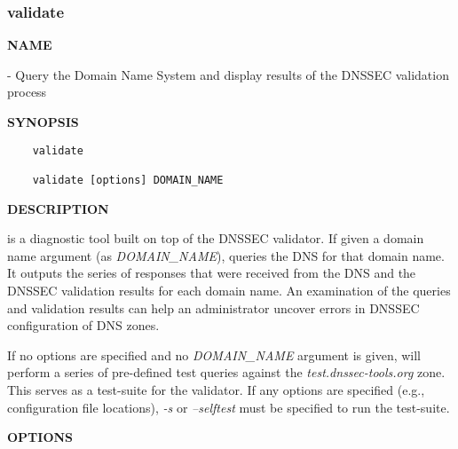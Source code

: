\clearpage

\subsubsection{\bf validate}

{\bf NAME}

 - Query the Domain Name System and display results of the
DNSSEC validation process

{\bf SYNOPSIS}

\begin{verbatim}
    validate

    validate [options] DOMAIN_NAME
\end{verbatim}

{\bf DESCRIPTION}

 is a diagnostic tool built on top of the DNSSEC validator.  If
given a domain name argument (as {\it DOMAIN\_NAME}),  queries
the DNS for that domain name.  It outputs the series of responses that were
received from the DNS and the DNSSEC validation results for each domain name.
An examination of the queries and validation results can help an administrator
uncover errors in DNSSEC configuration of DNS zones.

If no options are specified and no {\it DOMAIN\_NAME} argument is given,
 will perform a series of pre-defined test queries against the
{\it test.dnssec-tools.org} zone.  This serves as a test-suite for the
validator.  If any options are specified (e.g., configuration file locations),
{\it -s} or {\it --selftest} must be specified to run the test-suite.

{\bf OPTIONS}

